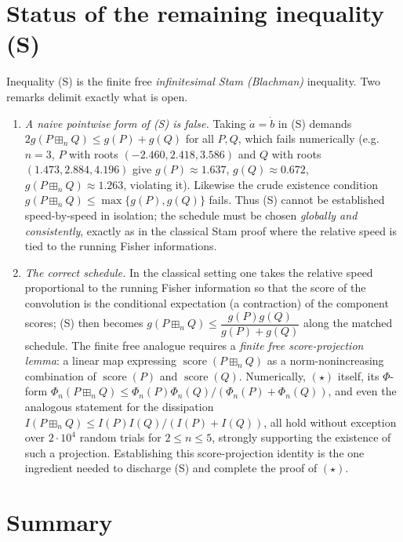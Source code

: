 \documentclass[12pt]{article}
\theoremstyle{remark}
\DeclareMathOperator{\score}{score}
\newcommand{\boxp}{\boxplus_n}
\begin{document}
\section{Status of the remaining inequality (S)}\label{sec:gap}

Inequality (S) is the finite free \emph{infinitesimal Stam (Blachman)}
inequality.  Two remarks delimit exactly what is open.

\begin{enumerate}
\item \emph{A naive pointwise form of (S) is false.} Taking
$\dot a=\dot b$ in (S) demands $2g(P\boxp Q)\le g(P)+g(Q)$ for all $P,Q$,
which fails numerically (e.g.\ $n=3$,
$P$ with roots $(-2.460,2.418,3.586)$ and $Q$ with roots
$(1.473,2.884,4.196)$ give $g(P)\approx1.637$, $g(Q)\approx0.672$,
$g(P\boxp Q)\approx1.263$, violating it).  Likewise the crude existence
condition $g(P\boxp Q)\le\max\{g(P),g(Q)\}$ fails.  Thus (S) cannot be
established speed-by-speed in isolation; the schedule must be chosen
\emph{globally and consistently}, exactly as in the classical Stam proof where
the relative speed is tied to the running Fisher informations.

\item \emph{The correct schedule.} In the classical setting one takes the
relative speed proportional to the running Fisher information so that the score
of the convolution is the conditional expectation (a contraction) of the
component scores; (S) then becomes
$g(P\boxp Q)\le \dfrac{g(P)g(Q)}{g(P)+g(Q)}$ along the matched schedule.  The
finite free analogue requires a \emph{finite free score-projection lemma}: a
linear map expressing $\score(P\boxp Q)$ as a norm-nonincreasing combination of
$\score(P)$ and $\score(Q)$.  Numerically, $(\star)$ itself,
its $\Phi$-form $\Phi_n(P\boxp Q)\le\Phi_n(P)\Phi_n(Q)/(\Phi_n(P)+\Phi_n(Q))$,
and even the analogous statement for the dissipation
$I(P\boxp Q)\le I(P)I(Q)/(I(P)+I(Q))$, all hold without exception over
$2\cdot10^4$ random trials for $2\le n\le5$, strongly supporting the existence
of such a projection.  Establishing this score-projection identity is the one
ingredient needed to discharge (S) and complete the proof of $(\star)$.
\end{enumerate}

\section{Summary}
\end{document}
